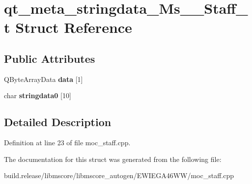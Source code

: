 \hypertarget{structqt__meta__stringdata___ms_____staff__t}{}\section{qt\+\_\+meta\+\_\+stringdata\+\_\+\+Ms\+\_\+\+\_\+\+Staff\+\_\+t Struct Reference}
\label{structqt__meta__stringdata___ms_____staff__t}
\subsection*{Public Attributes}
\begin{DoxyCompactItemize}
\item 
\mbox{\label{structqt__meta__stringdata___ms_____staff__t_a7f0972436c3715b527363f2b784664d1}} 
Q\+Byte\+Array\+Data {\bfseries data} \mbox{[}1\mbox{]}
\item 
\mbox{\label{structqt__meta__stringdata___ms_____staff__t_a39922e2ad5f786b330620c50ef353999}} 
char {\bfseries stringdata0} \mbox{[}10\mbox{]}
\end{DoxyCompactItemize}


\subsection{Detailed Description}


Definition at line 23 of file moc\+\_\+staff.\+cpp.



The documentation for this struct was generated from the following file\+:\begin{DoxyCompactItemize}
\item 
build.\+release/libmscore/libmscore\+\_\+autogen/\+E\+W\+I\+E\+G\+A46\+W\+W/moc\+\_\+staff.\+cpp\end{DoxyCompactItemize}
